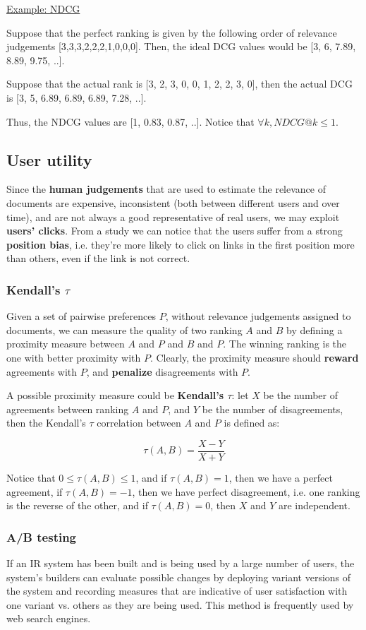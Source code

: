 \underline{Example: NDCG}

Suppose that the perfect ranking is given by the following order of relevance judgements [3,3,3,2,2,2,1,0,0,0]. Then, the ideal DCG values would be [3, 6, 7.89, 8.89, 9.75, ..]. 

Suppose that the actual rank is [3, 2, 3, 0, 0, 1, 2, 2, 3, 0], then the actual DCG is [3, 5, 6.89, 6.89, 6.89, 7.28, ..].

Thus, the NDCG values are [1, 0.83, 0.87, ..]. Notice that $\forall k, NDCG@k \leq 1$.

\subsection{User utility}
Since the \textbf{human judgements} that are used to estimate the relevance of documents are expensive, inconsistent (both between different users and over time), and are not always a good representative of real users, we may exploit \textbf{users' clicks}. From a study we can notice that the users suffer from a strong \textbf{position bias}, i.e. they're more likely to click on links in the first position more than others, even if the link is not correct.

\subsubsection{Kendall's $\tau$}
Given a set of pairwise preferences $P$, without relevance judgements assigned to documents, we can measure the quality of two ranking $A$ and $B$ by defining a proximity measure between $A$ and $P$ and $B$ and $P$. The winning ranking is the one with better proximity with $P$. Clearly, the proximity measure should \textbf{reward} agreements with $P$, and \textbf{penalize} disagreements with $P$.

A possible proximity measure could be \textbf{Kendall's $\tau$}: let $X$ be the number of agreements between ranking $A$ and $P$, and $Y$ be the number of disagreements, then the Kendall's $\tau$ correlation between $A$ and $P$ is defined as:

$$
\tau(A,B) = \frac{X-Y}{X+Y}
$$

Notice that $0 \leq \tau(A,B) \leq 1$, and if $\tau(A,B) = 1$, then we have a perfect agreement, if $\tau(A,B) = -1$, then we have perfect disagreement, i.e. one ranking is the reverse of the other, and if $\tau(A,B) = 0$, then $X$ and $Y$ are independent.

\subsubsection{A/B testing}
If an IR system has been built and is being used by a large number of users, the system’s builders can evaluate possible changes by deploying variant versions of the system and recording measures that are indicative of user satisfaction with one variant vs. others as they are being used. This method is frequently used by web search engines. 

